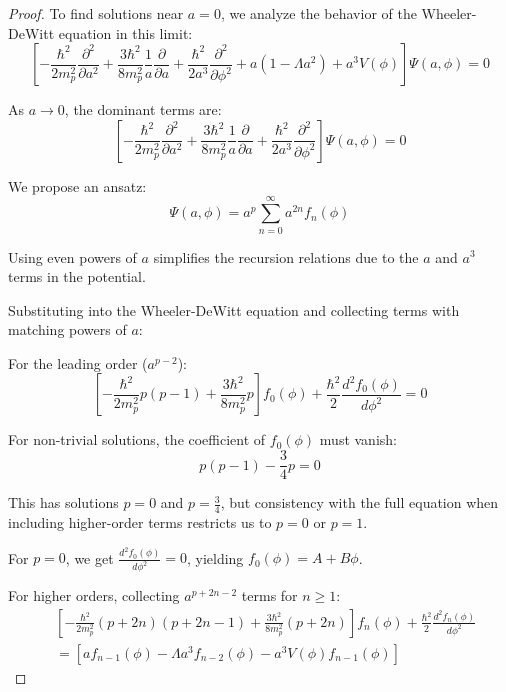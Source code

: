 \documentclass{article}
\begin{document}
\begin{proof}
To find solutions near $a=0$, we analyze the behavior of the Wheeler-DeWitt equation in this limit:
\begin{equation}
\left[-\frac{\hbar^2}{2m_p^2}\frac{\partial^2}{\partial a^2} + \frac{3\hbar^2}{8m_p^2}\frac{1}{a}\frac{\partial}{\partial a} + \frac{\hbar^2}{2a^3}\frac{\partial^2}{\partial \phi^2} + a(1-\Lambda a^2) + a^3V(\phi)\right]\Psi(a,\phi) = 0
\end{equation}

As $a \to 0$, the dominant terms are:
\begin{equation}
\left[-\frac{\hbar^2}{2m_p^2}\frac{\partial^2}{\partial a^2} + \frac{3\hbar^2}{8m_p^2}\frac{1}{a}\frac{\partial}{\partial a} + \frac{\hbar^2}{2a^3}\frac{\partial^2}{\partial \phi^2}\right]\Psi(a,\phi) = 0
\end{equation}

We propose an ansatz:
\begin{equation}
\Psi(a,\phi) = a^p\sum_{n=0}^{\infty}a^{2n}f_n(\phi)
\end{equation}

Using even powers of $a$ simplifies the recursion relations due to the $a$ and $a^3$ terms in the potential.

Substituting into the Wheeler-DeWitt equation and collecting terms with matching powers of $a$:

For the leading order ($a^{p-2}$):
\begin{equation}
\left[-\frac{\hbar^2}{2m_p^2}p(p-1) + \frac{3\hbar^2}{8m_p^2}p\right]f_0(\phi) + \frac{\hbar^2}{2}\frac{d^2f_0(\phi)}{d\phi^2} = 0
\end{equation}

For non-trivial solutions, the coefficient of $f_0(\phi)$ must vanish:
\begin{equation}
p(p-1) - \frac{3}{4}p = 0
\end{equation}

This has solutions $p=0$ and $p=\frac{3}{4}$, but consistency with the full equation when including higher-order terms restricts us to $p=0$ or $p=1$.

For $p=0$, we get $\frac{d^2f_0(\phi)}{d\phi^2} = 0$, yielding $f_0(\phi) = A + B\phi$.

For higher orders, collecting $a^{p+2n-2}$ terms for $n \geq 1$:
\begin{equation}
\begin{split}
&\left[-\frac{\hbar^2}{2m_p^2}(p+2n)(p+2n-1) + \frac{3\hbar^2}{8m_p^2}(p+2n)\right]f_n(\phi) + \frac{\hbar^2}{2}\frac{d^2f_n(\phi)}{d\phi^2} \\
&= [af_{n-1}(\phi) - \Lambda a^3f_{n-2}(\phi) - a^3V(\phi)f_{n-1}(\phi)]
\end{split}
\end{equation}


\end{proof}
\end{document}
